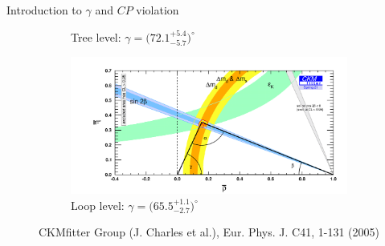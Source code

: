 \documentclass{beamer}
\begin{document}
\begin{frame}{Introduction to $\gamma$ and $C\!P$ violation}
\begin{figure}
\begin{subfigure}{0.5\textwidth}
      \caption{Tree level: $\gamma = \big(72.1^{+5.4}_{-5.7}\big)^\circ$}
    \end{subfigure}%
    \begin{subfigure}{0.5\textwidth}
      \centering
      \includegraphics[width = 1.0\textwidth]{Plots/ckmfitter_loop.png}
      \caption{Loop level: $\gamma = \big(65.5^{+1.1}_{-2.7}\big)^\circ$}
    \end{subfigure}
    \vspace{-0.3cm}
    \caption*{\tiny CKMfitter Group (J. Charles et al.), Eur. Phys. J. C41, 1-131 (2005)}
  \end{figure}
\end{frame}
\end{document}
